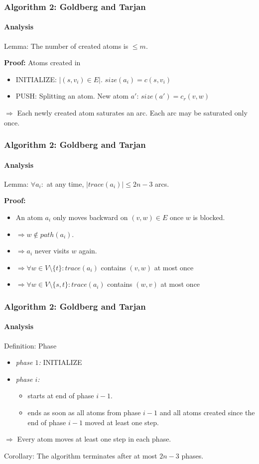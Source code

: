 \documentclass{beamer}
\begin{document}
\begin{frame}
\frametitle{Algorithm 2: Goldberg and Tarjan}
\framesubtitle{Analysis}
\begin{block}{Lemma:}
	The number of created atoms is $\leq m$.
\end{block}
\pause
\textbf{Proof:} Atoms created in \\
\begin{itemize}
	\item INITIALIZE: $\lvert (s,v_i) \in E \rvert$. $size(a_i) = c(s,v_i)$\\
	\item PUSH: Splitting an atom. New atom $a'$: $size(a') = c_r(v,w)$
\end{itemize}
\bigskip

$\Rightarrow$ Each newly created atom saturates an arc. Each arc may be saturated only once.
\end{frame}

\begin{frame}
\frametitle{Algorithm 2: Goldberg and Tarjan}
\framesubtitle{Analysis}
\begin{block}{Lemma:}
	$\forall a_i:$ at any time, $\lvert trace(a_i) \rvert \leq 2n-3$ arcs.
\end{block}
\pause
\textbf{Proof:} 
\begin{itemize}
	\item An atom $a_i$ only moves backward on $(v,w) \in E$ once $w$ is blocked.
	\item $\Rightarrow w \notin path(a_i)$.
	\item $\Rightarrow a_i$ never visits $w$ again.
	\item $\Rightarrow \forall w \in V \setminus \{t\}: trace(a_i)$ contains $(v,w)$ at most once
	\item $\Rightarrow \forall w \in V \setminus \{s,t\}: trace(a_i)$ contains $(w,v)$ at most once
\end{itemize}
\end{frame}

\begin{frame}
\frametitle{Algorithm 2: Goldberg and Tarjan}
\framesubtitle{Analysis}
\begin{block}{Definition: Phase}
	\begin{itemize}
		\item \textit{phase $1$:} INITIALIZE
		\item \textit{phase $i$:}
		\begin{itemize}
			\item starts at end of phase $i-1$.
			\item ends as soon as all atoms from phase $i-1$ and all atoms created since the end of phase $i-1$ moved at least one step.
		\end{itemize}
	\end{itemize}		
\end{block}
\bigskip
$\Rightarrow$ Every atom moves at least one step in each phase.
\pause
\begin{block}{Corollary:}
	The algorithm terminates after at most $2n - 3$ phases.
\end{block}
\end{frame}
\end{document}
